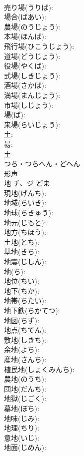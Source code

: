 \documentclass[8pt]{extreport}
\begin{document}
\begin{CJK}{UTF8}{min}
\\	売り場(うりば): 
\\	場合(ばあい): 
\\	農場(のうじょう): 
\\	本場(ほんば): 
\\	飛行場(ひこうじょう): 
\\	道場(どうじょう): 
\\	役場(やくば): 
\\	式場(しきじょう): 
\\	酒場(さかば): 
\\	満場(まんじょう): 
\\	市場(しじょう): 
\\	場(ば): 
\\	来場(らいじょう): 
\\	土: 
\\	昜: 
\\	土	
\\	つち・つちへん・どへん	
\\	形声 
\\	地	チ、ジ		どま	
\\	現地(げんち): 
\\	地域(ちいき): 
\\	地球(ちきゅう): 
\\	地元(じもと): 
\\	地方(ちほう): 
\\	土地(とち): 
\\	基地(きち): 
\\	地震(じしん): 
\\	地(ち): 
\\	地位(ちい): 
\\	地下(ちか): 
\\	地帯(ちたい): 
\\	地下鉄(ちかてつ): 
\\	地図(ちず): 
\\	地点(ちてん): 
\\	敷地(しきち): 
\\	余地(よち): 
\\	産地(さんち): 
\\	植民地(しょくみんち): 
\\	農地(のうち): 
\\	団地(だんち): 
\\	地獄(じごく): 
\\	墓地(ぼち): 
\\	地味(じみ): 
\\	地理(ちり): 
\\	意地(いじ): 
\\	地面(じめん): 

\end{CJK}
\end{document}
